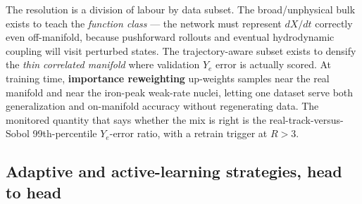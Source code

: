 \documentclass[11pt]{article}
\begin{document}
The resolution is a division of labour by data subset. The broad/unphysical bulk exists to teach the \emph{function class} --- the network must represent $dX/dt$ correctly even off-manifold, because pushforward rollouts and eventual hydrodynamic coupling will visit perturbed states. The trajectory-aware subset exists to densify the \emph{thin correlated manifold} where validation $Y_e$ error is actually scored. At training time, \textbf{importance reweighting} up-weights samples near the real manifold and near the iron-peak weak-rate nuclei, letting one dataset serve both generalization and on-manifold accuracy without regenerating data. The monitored quantity that says whether the mix is right is the real-track-versus-Sobol 99th-percentile $Y_e$-error ratio, with a retrain trigger at $R > 3$.

\subsection{Adaptive and active-learning strategies, head to head}
\end{document}
